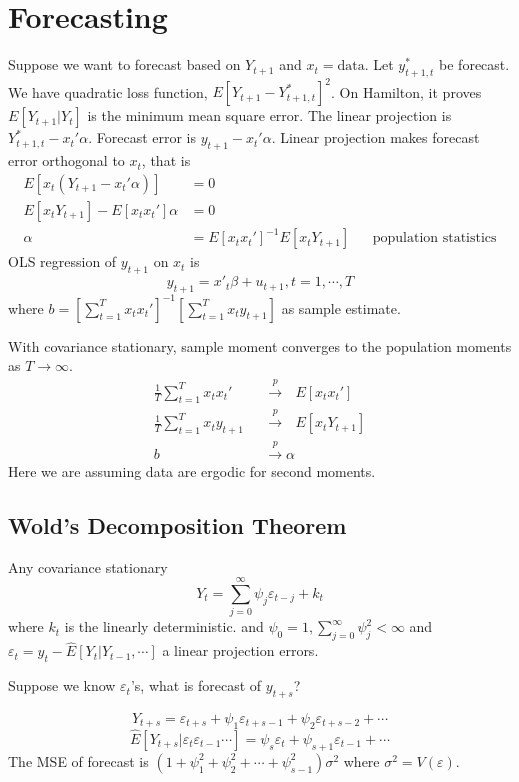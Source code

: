 \documentclass[11pt, a4paper, oneside]{article}
\theoremstyle{definition}
\theoremstyle{proposition}
\theoremstyle{corollary}
\theoremstyle{lemma}
\theoremstyle{theorem}
\begin{document}
\section{Forecasting}

Suppose we want to forecast based on $Y_{t+1}$ and $x_t = \text{data}$. Let $y_{t+1, t}^*$ be forecast. We have quadratic loss function, $E[Y_{t+1} - Y_{t+1,t}^*]^2$. On Hamilton, it proves $E[Y_{t+1}|Y_t]$ is the minimum mean square error. The linear projection is $Y_{t+1, t}^* - x_t'\alpha$. Forecast error is $y_{t+1} - x_t'\alpha$. Linear projection makes forecast error orthogonal to $x_t$, that is 
\begin{align*}
E[x_t (Y_{t+1}- x_t' \alpha)]&=0 \\
E[x_t Y_{t+1}] - E[x_tx_t'] \alpha &= 0 \\ 
\alpha &= E[x_tx_t']^{-1}E[x_tY_{t+1}] && \text{population statistics}
\end{align*}
OLS regression of $y_{t +1}$ on $x_t$ is 
$$y_{t+1} = x'_t\beta + u_{t+1}, t=1, \cdots, T$$
where $b = \left[\sum_{t=1}^T x_tx_t'\right]^{-1}\left[\sum_{t=1}^T x_t y_{t+1}\right]$ as sample estimate. 

With covariance stationary, sample moment converges to the population moments as $T\to\infty$. 
\begin{align*}
\frac{1}{T}\sum_{t=1}^Tx_tx_t' \text{ }&\overset{p}{\to} \text{ }E[x_tx_t']\\
\frac{1}{T}\sum_{t=1}^Tx_ty_{t+1}\text{ }&\overset{p}{\to} \text{ }E[x_tY_{t+1}]\\
b &\overset{p}{\to}\alpha
\end{align*}
Here we are assuming data are ergodic for second moments. 

\subsection{Wold's Decomposition Theorem}
Any covariance stationary
$$Y_t = \sum_{j=0}^{\infty} \psi_j \varepsilon_{t-j} + k_t$$ 
where $k_t$ is the linearly deterministic. and $\psi_0 = 1, \sum_{j=0}^{\infty}\psi_j^2 < \infty$ and $\varepsilon_t = y_t - \hat{E}[Y_t|Y_{t-1},\cdots]$ a linear projection errors. 

Suppose we know $\varepsilon_t$'s, what is forecast of $y_{t+s}$?

$$Y_{t+s}  = \varepsilon_{t+s} +\psi_1\varepsilon_{t+s-1}+\psi_2 \varepsilon_{t+s-2} + \cdots$$
$$\hat{E}[Y_{t+s}|\varepsilon_{t}\varepsilon_{t-1}\cdots] = \psi_s \varepsilon_t + \psi_{s+1}\varepsilon_{t-1}+\cdots$$
The MSE of forecast is $(1+\psi_1^2+\psi_2^2+\cdots+\psi_{s - 1}^2)\sigma^2$ where $\sigma^2 = V(\varepsilon)$. 
\end{document}
